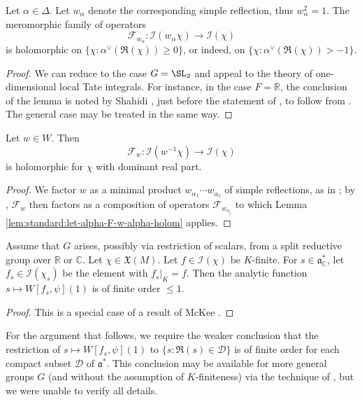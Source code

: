 \begin{lemma}\label{lem:standard:let-alpha-F-w-alpha-holom}
  Let $\alpha \in \Delta$.  Let $w_\alpha$ denote the corresponding simple reflection, thus $w_\alpha^2 = 1$.  The meromorphic family of operators
  \begin{equation*}
    \mathcal{F}_{w_\alpha} : \mathcal{I}(w_\alpha \chi ) \rightarrow \mathcal{I}(\chi)
  \end{equation*}
  is holomorphic on $\{\chi :  \alpha^\vee(\Re(\chi))   \geq 0\}$, or indeed, on $\{\chi :  \alpha^\vee(\Re(\chi)) > -1\}$.
\end{lemma}
\begin{proof}
  We can reduce to the case $G = \SL_2$ and appeal to the theory of one-dimensional local Tate integrals.  For instance, in the case $F = \mathbb{R}$, the conclusion of the lemma is noted by Shahidi \cite{MR563369}, just before the statement of \cite[Lemma 2.3.2]{MR563369}, to follow from \cite[Prop 2.2.1]{MR563369}.  The general case may be treated in the same way.
\end{proof}

\begin{lemma}\label{lem:jacquet-integral-uniformity-question:let-w-in}
  Let $w \in W$.  Then
  \begin{equation*}
    \mathcal{F}_w : \mathcal{I}(w^{-1} \chi) \rightarrow \mathcal{I}(\chi)
  \end{equation*}
  is holomorphic for $\chi$ with dominant real part.
\end{lemma}
\begin{proof}
  We factor $w$ as a minimal product $w_{\alpha_1} \dotsb w_{\alpha_{\ell}}$ of simple reflections, as in \cite[Thm 2.1.1]{MR610479}; by \cite[\S3.2]{MR610479}, $\mathcal{F}_w$ then factors as a composition of operators $\mathcal{F}_{w_{\alpha_j}}$ to which Lemma \ref{lem:standard:let-alpha-F-w-alpha-holom} applies.
\end{proof}

\begin{lemma}\label{lem:assume-that-g}
  Assume that $G$ arises, possibly via restriction of scalars, from a split reductive group over $\mathbb{R}$ or $\mathbb{C}$.  Let $\chi \in \mathfrak{X}(M)$.  Let $f \in \mathcal{I}(\chi)$ be $K$-finite.  For $s \in \mathfrak{a}_{\mathbb{C}}^*$, let $f_s \in \mathcal{I}(\chi_s)$ be the element with $f_s|_K = f$.  Then the analytic function $s \mapsto W[f_s,\psi](1)$ is of finite order $\leq 1$.
\end{lemma}
\begin{proof}
  This is a special case of a result of McKee \cite[Thm 5.2]{MR3043499}.
\end{proof}
\begin{remark}
  For the argument that follows, we require the weaker conclusion that the restriction of $s \mapsto W[f_s,\psi](1)$ to $\{s : \Re(s) \in \mathcal{D} \}$ is of finite order for each compact subset $\mathcal{D}$ of $\mathfrak{a}^*$.  This conclusion may be available for more general groups $G$ (and without the assumption of $K$-finiteness) via the technique of \cite[Proof of Lemma 5.6]{MR1800349}, but we were unable to verify all details.
\end{remark}



